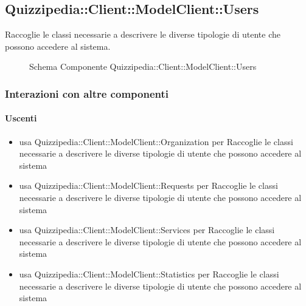 \subsection{Quizzipedia::Client::ModelClient::Users}
Raccoglie le classi necessarie a descrivere le diverse tipologie di utente che possono accedere al sistema.
\begin{figure}[H]
\centering
\noindent{}
\caption[Schema Componente Quizzipedia::Client::ModelClient::Users]{Schema Componente Quizzipedia::Client::ModelClient::Users}
\end{figure}
\subsubsection{Interazioni con altre componenti}
\paragraph{Uscenti}
\begin{itemize}
\item usa Quizzipedia::Client::ModelClient::Organization per Raccoglie le classi necessarie a descrivere le diverse tipologie di utente che possono accedere al sistema
\item usa Quizzipedia::Client::ModelClient::Requests per Raccoglie le classi necessarie a descrivere le diverse tipologie di utente che possono accedere al sistema
\item usa Quizzipedia::Client::ModelClient::Services per Raccoglie le classi necessarie a descrivere le diverse tipologie di utente che possono accedere al sistema
\item usa Quizzipedia::Client::ModelClient::Statistics per Raccoglie le classi necessarie a descrivere le diverse tipologie di utente che possono accedere al sistema
\end{itemize}
